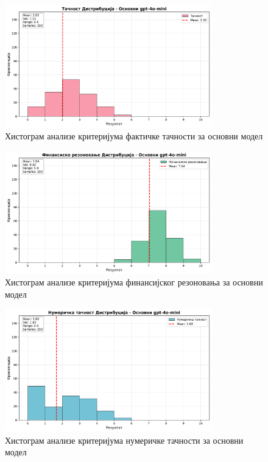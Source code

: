 \begin{figure}[h]
    \centering
    \includegraphics[width=0.8\textwidth]{images/osnovni/criteria_analysis_factual_correctness_histogram.png}
    \caption{Хистограм анализе критеријума фактичке тачности за основни модел}
    \label{fig:osnovni_factual}
\end{figure}

\begin{figure}[h]
    \centering
    \includegraphics[width=0.8\textwidth]{images/osnovni/criteria_analysis_financial_reasoning_histogram.png}
    \caption{Хистограм анализе критеријума финансијског резоновања за основни модел}
    \label{fig:osnovni_financial}
\end{figure}

\begin{figure}[h]
    \centering
    \includegraphics[width=0.8\textwidth]{images/osnovni/criteria_analysis_numerical_accuracy_histogram.png}
    \caption{Хистограм анализе критеријума нумеричке тачности за основни модел}
    \label{fig:osnovni_numerical}
\end{figure}

